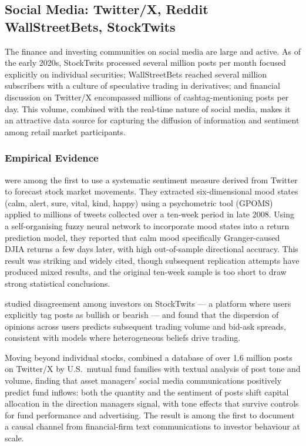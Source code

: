 \subsection{Social Media: Twitter/X, Reddit WallStreetBets, StockTwits}
\label{sec:ch09-social-media}

The finance and investing communities on social media are large and active. As of the early 2020s, StockTwits processed several million posts per month focused explicitly on individual securities; WallStreetBets reached several million subscribers with a culture of speculative trading in derivatives; and financial discussion on Twitter/X encompassed millions of cashtag-mentioning posts per day. This volume, combined with the real-time nature of social media, makes it an attractive data source for capturing the diffusion of information and sentiment among retail market participants.

\subsubsection*{Empirical Evidence}

\citet{bollen2011twitter} were among the first to use a systematic sentiment measure derived from Twitter to forecast stock market movements. They extracted six-dimensional mood states (calm, alert, sure, vital, kind, happy) using a psychometric tool (GPOMS) applied to millions of tweets collected over a ten-week period in late 2008. Using a self-organising fuzzy neural network to incorporate mood states into a return prediction model, they reported that calm mood specifically Granger-caused DJIA returns a few days later, with high out-of-sample directional accuracy. This result was striking and widely cited, though subsequent replication attempts have produced mixed results, and the original ten-week sample is too short to draw strong statistical conclusions.

\citet{cookson2020echo} studied disagreement among investors on StockTwits --- a platform where users explicitly tag posts as bullish or bearish --- and found that the dispersion of opinions across users predicts subsequent trading volume and bid-ask spreads, consistent with models where heterogeneous beliefs drive trading.

Moving beyond individual stocks, \citet{gilbazo2025tweeting} combined a database of over 1.6 million posts on Twitter/X by U.S.\ mutual fund families with textual analysis of post tone and volume, finding that asset managers' social media communications positively predict fund inflows: both the quantity and the sentiment of posts shift capital allocation in the direction managers signal, with tone effects that survive controls for fund performance and advertising. The result is among the first to document a causal channel from financial-firm text communications to investor behaviour at scale.

